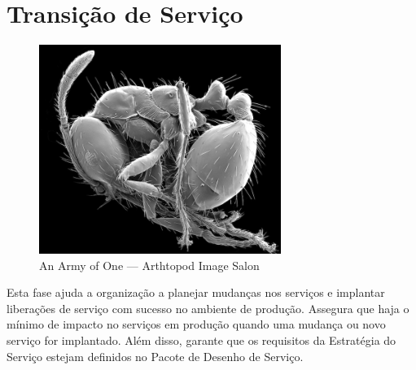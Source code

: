 %
%
%
%


\chapter{Transição de Serviço}
\label{cha:trans}


\begin{figure}
    \centering
    \includegraphics[width=0.7\textwidth]{img/ant_microscope}\\
    {\scriptsize An Army of One --- Arthtopod Image Salon}
\end{figure}

Esta fase ajuda a organização a planejar mudanças nos serviços e implantar
liberações de serviço com sucesso no ambiente de produção. Assegura que haja o
mínimo de impacto no serviços em produção quando uma mudança ou novo serviço
for implantado. Além disso, garante que os requisitos da Estratégia do Serviço
estejam definidos no Pacote de Desenho de Serviço.


